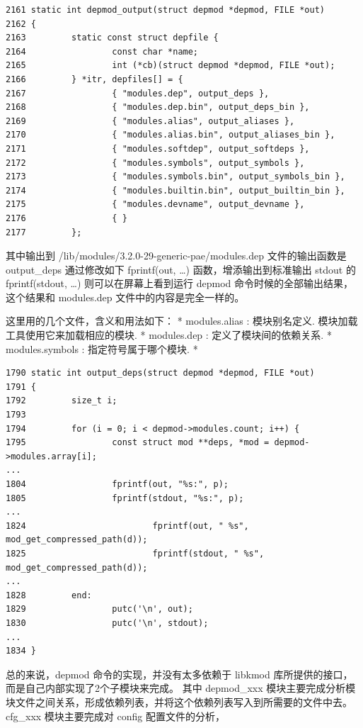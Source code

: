 \documentclass[11pt,a4paper]{article}
\begin{document}
{\begin{shaded}\begin{verbatim}
2161 static int depmod_output(struct depmod *depmod, FILE *out)
2162 {
2163         static const struct depfile {
2164                 const char *name;
2165                 int (*cb)(struct depmod *depmod, FILE *out);
2166         } *itr, depfiles[] = {
2167                 { "modules.dep", output_deps },
2168                 { "modules.dep.bin", output_deps_bin },
2169                 { "modules.alias", output_aliases },
2170                 { "modules.alias.bin", output_aliases_bin },
2171                 { "modules.softdep", output_softdeps },
2172                 { "modules.symbols", output_symbols },
2173                 { "modules.symbols.bin", output_symbols_bin },
2174                 { "modules.builtin.bin", output_builtin_bin },
2175                 { "modules.devname", output_devname },
2176                 { }
2177         };
\end{verbatim}\end{shaded}}
其中输出到 /lib/modules/3.2.0-29-generic-pae/modules.dep
文件的输出函数是 output\_deps 通过修改如下 fprintf(out, \ldots{})
函数，增添输出到标准输出 stdout 的 fprintf(stdout, \ldots{})
则可以在屏幕上看到运行 depmod 命令时候的全部输出结果，这个结果和
modules.dep 文件中的内容是完全一样的。

这里用的几个文件，含义和用法如下： * modules.alias : 模块别名定义.
模块加载工具使用它来加载相应的模块. * modules.dep :
定义了模块间的依赖关系. * modules.symbols : 指定符号属于哪个模块. *

{\begin{shaded}\begin{verbatim}
1790 static int output_deps(struct depmod *depmod, FILE *out)
1791 {
1792         size_t i;
1793 
1794         for (i = 0; i < depmod->modules.count; i++) {
1795                 const struct mod **deps, *mod = depmod->modules.array[i];
...
1804                 fprintf(out, "%s:", p);
1805                 fprintf(stdout, "%s:", p);
...
1824                         fprintf(out, " %s", mod_get_compressed_path(d));
1825                         fprintf(stdout, " %s", mod_get_compressed_path(d));
...
1828         end:
1829                 putc('\n', out);
1830                 putc('\n', stdout);
... 
1834 }
\end{verbatim}\end{shaded}}
总的来说，depmod 命令的实现，并没有太多依赖于 libkmod
库所提供的接口，而是自己内部实现了2个子模块来完成。 其中 depmod\_xxx
模块主要完成分析模块文件之间关系，形成依赖列表，并将这个依赖列表写入到所需要的文件中去。
cfg\_xxx 模块主要完成对 config 配置文件的分析，
\end{document}
